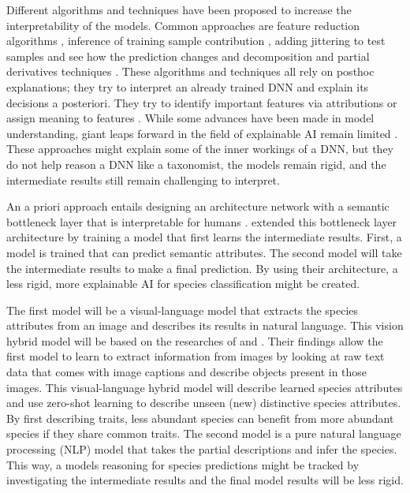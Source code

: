 \documentclass[a4paper, 12pt, oneside]{book} %
\begin{document}
Different algorithms and techniques have been proposed to increase the interpretability of the models.
Common approaches are feature reduction algorithms \autocite{ribeiro_why_2016}, inference of training sample contribution \autocite{koh_understanding_2020}, adding jittering to test samples and see how the prediction changes \autocite{li_understanding_2017} and decomposition and partial derivatives techniques \autocite{samek_explainable_2017}.
These algorithms and techniques all rely on posthoc explanations; they try to interpret an already trained DNN and explain its decisions a posteriori.
They try to identify important features via attributions \autocite{zintgraf_visualizing_2017, selvaraju_grad-cam_2017} or assign meaning to features \autocite{fleet_visualizing_2014}.
While some advances have been made in model understanding, giant leaps forward in the field of explainable AI remain limited \autocite{lipton_mythos_2017, li_interpretable_2021}.
These approaches might explain some of the inner workings of a DNN, but they do not help reason a DNN like a taxonomist, the models remain rigid, and the intermediate results still remain challenging to interpret. 

An a priori approach entails designing an architecture network with a semantic bottleneck layer that is interpretable for humans \autocite{bucher_semantic_2019}. 
\textcite{ishikawa_contextual_2021} extended this bottleneck layer architecture by training a model that first learns the intermediate results.
First, a model is trained that can predict semantic attributes.
The second model will take the intermediate results to make a final prediction.
By using their architecture, a less rigid, more explainable AI for species classification might be created.

The first model will be a visual-language model that extracts the species attributes from an image and describes its results in natural language. 
This vision hybrid model will be based on the researches of \textcite{radford_learning_2021} and \textcite{huang_interpretable_2020}.
Their findings allow the first model to learn to extract information from images by looking at raw text data that comes with image captions and describe objects present in those images.
This visual-language hybrid model will describe learned species attributes and use zero-shot learning to describe unseen (new) distinctive species attributes.
By first describing traits, less abundant species can benefit from more abundant species if they share common traits.
The second model is a pure natural language processing (NLP) model that takes the partial descriptions and infer the species.
This way, a models reasoning for species predictions might be tracked by investigating the intermediate results \autocite{ishikawa_contextual_2021} and the final model results will be less rigid.
\end{document}
